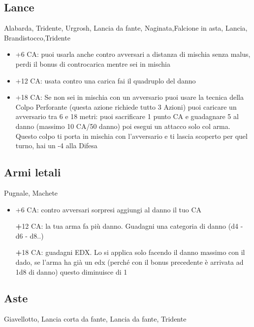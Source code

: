 \documentclass[a4paper,11pt,twoside,openany]{book}
\begin{document}
\subsection{Lance} Alabarda, Tridente, Urgrosh, Lancia da fante, Naginata,Falcione in asta, Lancia, Brandistocco,Tridente

\begin{itemize}
\item +6 CA: puoi usarla anche contro avversari a distanza di mischia senza malus, perdi il bonus di controcarica mentre sei in mischia

\item +12 CA: usata contro una carica fai il quadruplo del danno

\item +18 CA: Se non sei in mischia con un avversario puoi usare la tecnica della Colpo Perforante (questa azione richiede tutto 3 Azioni) puoi caricare un avversario tra 6 e 18 metri: puoi sacrificare 1 punto CA e guadagnare 5 al danno (massimo 10 CA/50 danno) poi esegui un attacco solo col arma. Questo colpo ti porta in mischia con l'avversario e ti lascia scoperto per quel turno, hai un -4 alla Difesa

\end{itemize}

\subsection{Armi letali} Pugnale, Machete

\begin{itemize}

\item +6 CA: contro avversari sorpresi aggiungi al danno il tuo CA

\textbf +12 CA: la tua arma fa più danno. Guadagni una categoria di danno (d4 - d6 - d8..)

\textbf +18 CA: guadagni EDX. Lo si applica solo facendo il danno massimo con il dado, se l'arma ha già un edx (perché con il bonus precedente è arrivata ad 1d8 di danno)
questo diminuisce di 1

\end{itemize}

\subsection{Aste} Giavellotto, Lancia corta da fante, Lancia da fante, Tridente
\end{document}

